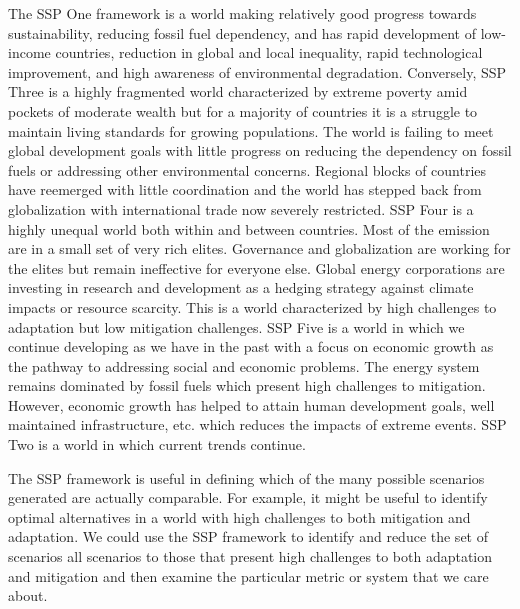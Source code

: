 \documentclass[10pt]{amsart}
\begin{document}
The SSP One framework is a world making relatively good progress towards sustainability, reducing fossil fuel dependency, and has rapid development of low-income countries, reduction in global and local inequality, rapid technological improvement, and high awareness of environmental degradation.
Conversely, SSP Three is a highly fragmented world characterized by extreme poverty amid pockets of moderate wealth but for a majority of countries it is a struggle to maintain living standards for growing populations.
The world is failing to meet global development goals with little progress on reducing the dependency on fossil fuels or addressing other environmental concerns. 
Regional blocks of countries have reemerged with little coordination and the world has stepped back from globalization with international trade now severely restricted. 
SSP Four is a highly unequal world both within and between countries.
Most of the emission are in a small set of very rich elites.
Governance and globalization are working for the elites but remain ineffective for everyone else.
Global energy corporations are investing in research and development as a hedging strategy against climate impacts or resource scarcity.
This is a world characterized by high challenges to adaptation but low mitigation challenges.
SSP Five is a world in which we continue developing as we have in the past with a focus on economic growth as the pathway to addressing social and economic problems.
The energy system remains dominated by fossil fuels which present high challenges to mitigation.
However, economic growth has helped to attain human development goals, well maintained infrastructure, etc. which reduces the impacts of extreme events.
SSP Two is a world in which current trends continue.

The SSP framework is useful in defining which of the many possible scenarios generated are actually comparable. 
For example, it might be useful to identify optimal alternatives in a world with high challenges to both mitigation and adaptation. 
We could use the SSP framework to identify and reduce the set of scenarios all scenarios to those that present high challenges to both adaptation and mitigation and then examine the particular metric or system that we care about.
\end{document}
